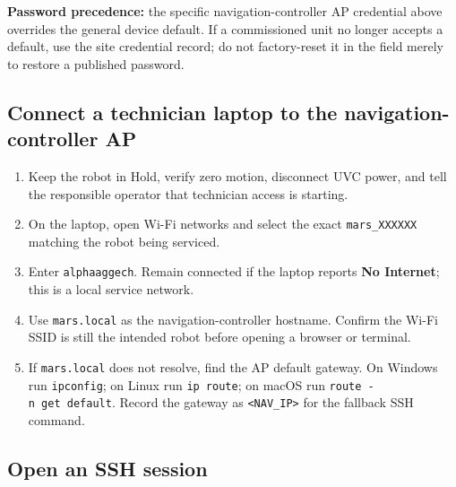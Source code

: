 \documentclass[
  10pt,
  letterpaper,
  openany]{report}
\providecommand{\tightlist}{%
  \setlength{\itemsep}{0pt}\setlength{\parskip}{0pt}}
\begin{document}
\begin{manualnotice}

\textbf{Password precedence:} the specific navigation-controller AP
credential above overrides the general device default. If a commissioned
unit no longer accepts a default, use the site credential record; do not
factory-reset it in the field merely to restore a published password.

\end{manualnotice}

\subsection{Connect a technician laptop to the navigation-controller
AP}\label{connect-a-technician-laptop-to-the-navigation-controller-ap}

\begin{enumerate}
\tightlist
\item
  Keep the robot in Hold, verify zero motion, disconnect UVC power, and
  tell the responsible operator that technician access is starting.
\item
  On the laptop, open Wi-Fi networks and select the exact
  \texttt{mars\_XXXXXX} matching the robot being serviced.
\item
  Enter \texttt{alphaaggech}. Remain connected if the laptop reports
  \textbf{No Internet}; this is a local service network.
\item
  Use \texttt{mars.local} as the navigation-controller hostname. Confirm
  the Wi-Fi SSID is still the intended robot before opening a browser or
  terminal.
\item
  If \texttt{mars.local} does not resolve, find the AP default gateway.
  On Windows run \texttt{ipconfig}; on Linux run \texttt{ip\ route}; on
  macOS run \texttt{route\ -n\ get\ default}. Record the gateway as
  \texttt{\textless{}NAV\_IP\textgreater{}} for the fallback SSH
  command.
\end{enumerate}

\subsection{Open an SSH session}\label{open-an-ssh-session}
\end{document}
